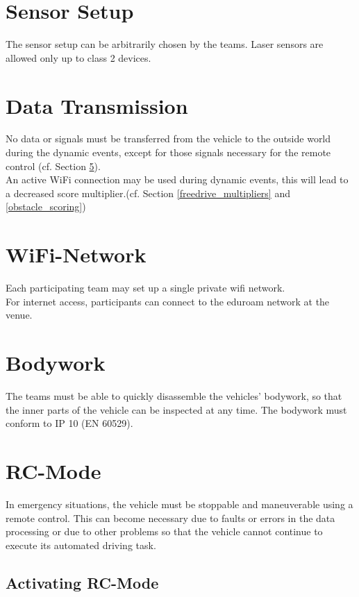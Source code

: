 \section{Sensor Setup}

The sensor setup can be arbitrarily chosen by the teams. Laser sensors are
allowed only up to class 2 devices.

\section{Data Transmission}

No data or signals must be transferred from the vehicle to the outside world
during the dynamic events, except for those signals necessary for the remote
control (cf. Section \ref{rc_mode}).\\ An active WiFi connection may be used
during dynamic events, this will lead to a decreased score multiplier.(cf.
Section \ref{freedrive_multipliers} and \ref{obstacle_scoring})

\section{WiFi-Network}

Each participating team may set up a single private wifi network.\\ For
internet access, participants can connect to the eduroam network at the
venue.\\

\section{Bodywork}

The teams must be able to quickly disassemble the vehicles’ bodywork, so that
the inner parts of the vehicle can be inspected at any time. The bodywork must
conform to IP 10 (EN 60529).

\section{RC-Mode}
\label{rc_mode}

In emergency situations, the vehicle must be stoppable and maneuverable using a
remote control. This can become necessary due to faults or errors in the data
processing or due to other problems so that the vehicle cannot continue to
execute its automated driving task.

\subsection{Activating RC-Mode}

